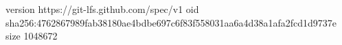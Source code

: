 version https://git-lfs.github.com/spec/v1
oid sha256:4762867989fab38180ae4bdbe697c6f83f558031aa6a4d38a1afa2fcd1d9737e
size 1048672
